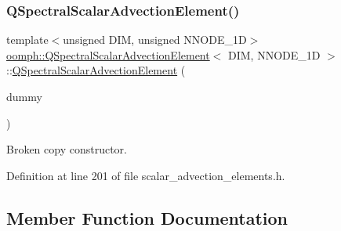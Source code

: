 \subsubsection{\texorpdfstring{Q\+Spectral\+Scalar\+Advection\+Element()}{QSpectralScalarAdvectionElement()}\hspace{0.1cm}{\footnotesize\ttfamily [2/2]}}
{\footnotesize\ttfamily template$<$unsigned D\+IM, unsigned N\+N\+O\+D\+E\+\_\+1D$>$ \\
\hyperlink{classoomph_1_1QSpectralScalarAdvectionElement}{oomph\+::\+Q\+Spectral\+Scalar\+Advection\+Element}$<$ D\+IM, N\+N\+O\+D\+E\+\_\+1D $>$\+::\hyperlink{classoomph_1_1QSpectralScalarAdvectionElement}{Q\+Spectral\+Scalar\+Advection\+Element} (\begin{DoxyParamCaption}\item[{const \hyperlink{classoomph_1_1QSpectralScalarAdvectionElement}{Q\+Spectral\+Scalar\+Advection\+Element}$<$ D\+IM, N\+N\+O\+D\+E\+\_\+1D $>$ \&}]{dummy }\end{DoxyParamCaption})\hspace{0.3cm}{\ttfamily [inline]}}



Broken copy constructor. 



Definition at line 201 of file scalar\+\_\+advection\+\_\+elements.\+h.



\subsection{Member Function Documentation}
\mbox{\label{classoomph_1_1QSpectralScalarAdvectionElement_ad6e292ae057d0ed3f3e9990fa35f9bcc}} 
